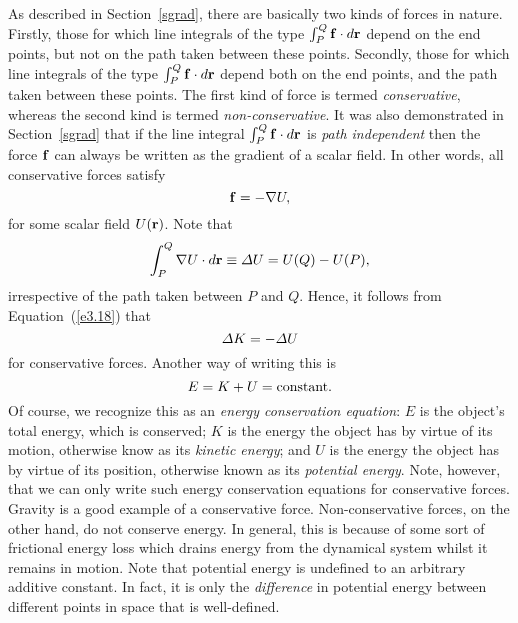 As described in Section~\ref{sgrad}, there are basically two kinds
of forces in nature. Firstly, those for which line integrals of the type
$\int_P^Q {\bf f}\cdot d{\bf r}$ depend on the end points, but not
on the path taken between these points. Secondly, those for which
line integrals of the type $\int_P^Q {\bf f}\cdot d{\bf r}$ depend
both on the end points, and the path taken between these points. 
The first kind of force is termed {\em conservative}, whereas the
second kind is termed {\em non-conservative}. It was also
demonstrated in Section~\ref{sgrad} that if the line integral $\int_P^Q {\bf f}\cdot d{\bf r}$ is {\em path independent}\/ then the force ${\bf f}$ can always
be written as the gradient of a scalar field. In other words, all
conservative forces satisfy
\begin{equation}\label{e3.16}
{\bf f} = - \nabla U,
\end{equation}
for some scalar field $U({\bf r})$.  
Note that
\begin{equation}
\int_P^Q \nabla U\cdot d{\bf r} \equiv {\mit\Delta} U = U(Q) - U(P),
\end{equation}
irrespective of the path taken between $P$ and $Q$. 
Hence, it follows from Equation~(\ref{e3.18})
that 
\begin{equation}
{\mit\Delta} K = - {\mit\Delta} U
\end{equation}
for conservative forces. Another way of writing this is 
\begin{equation}\label{e3.22}
E = K + U = {\rm constant}.
\end{equation}
Of course, we recognize this as an {\em energy conservation equation}: $E$
is the object's total energy, which is conserved; $K$ is the energy the
object has by virtue of its motion, otherwise know as its
{\em kinetic energy}; and $U$ is the energy the object has by
virtue of its position, otherwise known as its {\em potential
energy}. Note, however, that we can only write such  energy conservation
equations for conservative forces. Gravity is a good example of a conservative force.
Non-conservative forces, on the other hand,  do not conserve energy. In general, this
is because of some sort of frictional energy loss which drains energy
from the dynamical system whilst it remains in motion.
Note that potential energy is undefined to an arbitrary additive constant.
In fact, it is only the {\em difference}\/ in potential energy between
different points in space that is well-defined.

